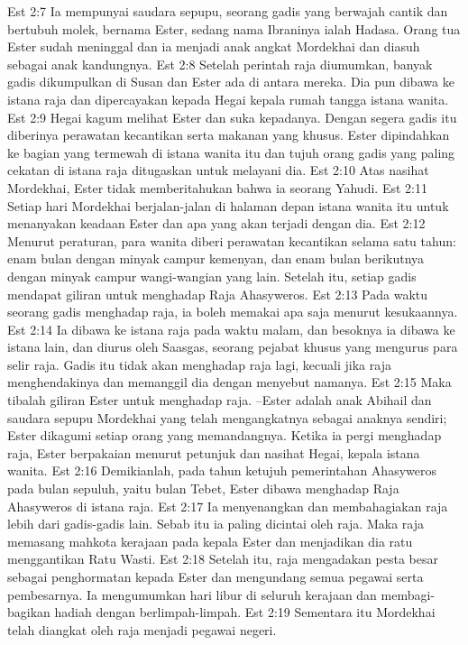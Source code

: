 Est 2:7  Ia mempunyai saudara sepupu, seorang gadis yang berwajah cantik dan bertubuh molek, bernama Ester, sedang nama Ibraninya ialah Hadasa. Orang tua Ester sudah meninggal dan ia menjadi anak angkat Mordekhai dan diasuh sebagai anak kandungnya.
Est 2:8  Setelah perintah raja diumumkan, banyak gadis dikumpulkan di Susan dan Ester ada di antara mereka. Dia pun dibawa ke istana raja dan dipercayakan kepada Hegai kepala rumah tangga istana wanita.
Est 2:9  Hegai kagum melihat Ester dan suka kepadanya. Dengan segera gadis itu diberinya perawatan kecantikan serta makanan yang khusus. Ester dipindahkan ke bagian yang termewah di istana wanita itu dan tujuh orang gadis yang paling cekatan di istana raja ditugaskan untuk melayani dia.
Est 2:10  Atas nasihat Mordekhai, Ester tidak memberitahukan bahwa ia seorang Yahudi.
Est 2:11  Setiap hari Mordekhai berjalan-jalan di halaman depan istana wanita itu untuk menanyakan keadaan Ester dan apa yang akan terjadi dengan dia.
Est 2:12  Menurut peraturan, para wanita diberi perawatan kecantikan selama satu tahun: enam bulan dengan minyak campur kemenyan, dan enam bulan berikutnya dengan minyak campur wangi-wangian yang lain. Setelah itu, setiap gadis mendapat giliran untuk menghadap Raja Ahasyweros.
Est 2:13  Pada waktu seorang gadis menghadap raja, ia boleh memakai apa saja menurut kesukaannya.
Est 2:14  Ia dibawa ke istana raja pada waktu malam, dan besoknya ia dibawa ke istana lain, dan diurus oleh Saasgas, seorang pejabat khusus yang mengurus para selir raja. Gadis itu tidak akan menghadap raja lagi, kecuali jika raja menghendakinya dan memanggil dia dengan menyebut namanya.
Est 2:15  Maka tibalah giliran Ester untuk menghadap raja. --Ester adalah anak Abihail dan saudara sepupu Mordekhai yang telah mengangkatnya sebagai anaknya sendiri; Ester dikagumi setiap orang yang memandangnya. Ketika ia pergi menghadap raja, Ester berpakaian menurut petunjuk dan nasihat Hegai, kepala istana wanita.
Est 2:16  Demikianlah, pada tahun ketujuh pemerintahan Ahasyweros pada bulan sepuluh, yaitu bulan Tebet, Ester dibawa menghadap Raja Ahasyweros di istana raja.
Est 2:17  Ia menyenangkan dan membahagiakan raja lebih dari gadis-gadis lain. Sebab itu ia paling dicintai oleh raja. Maka raja memasang mahkota kerajaan pada kepala Ester dan menjadikan dia ratu menggantikan Ratu Wasti.
Est 2:18  Setelah itu, raja mengadakan pesta besar sebagai penghormatan kepada Ester dan mengundang semua pegawai serta pembesarnya. Ia mengumumkan hari libur di seluruh kerajaan dan membagi-bagikan hadiah dengan berlimpah-limpah.
Est 2:19  Sementara itu Mordekhai telah diangkat oleh raja menjadi pegawai negeri.
